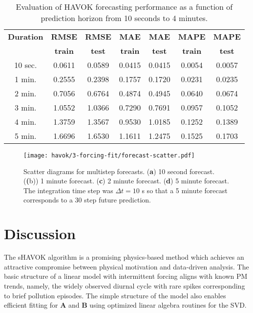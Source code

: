 \begin{table}[h]
  \caption{Evaluation of HAVOK forecasting performance as a function of
    prediction horizon from 10 seconds to 4 minutes.}
  \label{tab:havok-forecasting-results}
  \centering
  \begin{tabular}{ccccccc} \hline
    \textbf{Duration} & \textbf{RMSE}  & \textbf{RMSE} & \textbf{MAE}   & \textbf{MAE}  & \textbf{MAPE}  & \textbf{MAPE} \\
                      & \textbf{train} & \textbf{test} & \textbf{train} & \textbf{test} & \textbf{train} & \textbf{test} \\\hline
    10 sec.	  & 0.0611 & 0.0589 & 0.0415 & 0.0415 & 0.0054 & 0.0057 \\
    1 min.	  & 0.2555 & 0.2398 & 0.1757 & 0.1720 & 0.0231 & 0.0235 \\
    2 min.	  & 0.7056 & 0.6764 & 0.4874 & 0.4945 & 0.0640 & 0.0674 \\
    3 min.	  & 1.0552 & 1.0366 & 0.7290 & 0.7691 & 0.0957 & 0.1052 \\
    4 min.	  & 1.3759 & 1.3567 & 0.9530 & 1.0185 & 0.1252 & 0.1389 \\
    5 min. 	  & 1.6696 & 1.6530 & 1.1611 & 1.2475 & 0.1525 & 0.1703
  \end{tabular}
\end{table}






\begin{figure}[h]
  \centering
  \texttt{[image: havok/3-forcing-fit/forecast-scatter.pdf]}
  \caption{Scatter diagrams for multistep forecasts. (\textbf{a}) 10 second
    forecast. (\textbf(b)) 1 minute forecast. (\textbf{c}) 2 minute forecast.
    (\textbf{d}) 5 minute forecast. The integration time step was $\Delta t =
    10$ s so that a 5 minute forecast corresponds to a 30 step future prediction.}
  \label{fig:pm-time-series-w-forcing}
\end{figure}

\section{Discussion}

The sHAVOK algorithm is a promising physics-based method which achieves an
attractive compromise between physical motivation and data-driven analysis.
The basic structure of a linear model with intermittent
forcing aligns with known PM trends, namely, the widely observed diurnal cycle
with rare spikes corresponding to brief pollution episodes. The simple structure
of the model also enables efficient fitting for $\mathbf{A}$ and $\mathbf{B}$
using optimized linear algebra routines for the SVD.

